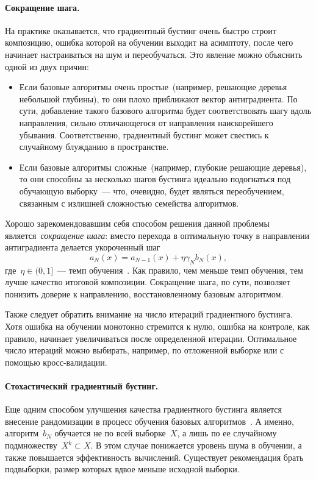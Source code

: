 \documentclass[12pt,fleqn]{article}
\begin{document}
\paragraph{Сокращение шага.}
На практике оказывается, что градиентный бустинг очень быстро
строит композицию, ошибка которой на обучении выходит на асимптоту,
после чего начинает настраиваться на шум и переобучаться.
Это явление можно объяснить одной из двух причин:
\begin{itemize}
    \item Если базовые алгоритмы очень простые~(например, решающие деревья небольшой глубины),
        то они плохо приближают вектор антиградиента.
        По сути, добавление такого базового алгоритма будет соответствовать шагу вдоль направления,
        сильно отличающегося от направления наискорейшего убывания.
        Соответственно, градиентный бустинг может свестись к случайному блужданию в пространстве.
    \item Если базовые алгоритмы сложные~(например, глубокие решающие деревья),
        то они способны за несколько шагов бустинга идеально подогнаться под обучающую выборку~---
        что, очевидно, будет являться переобучением, связанным с излишней сложностью семейства алгоритмов.
\end{itemize}
Хорошо зарекомендовавшим себя способом решения данной проблемы
является~\emph{сокращение шага}: вместо перехода в оптимальную
точку в направлении антиградиента делается укороченный шаг
\[
    a_N(x)
    =
    a_{N - 1}(x)
    +
    \eta
    \gamma_N
    b_N(x),
\]
где~$\eta \in (0, 1]$~--- темп обучения~\cite{friedman01gbm}.
Как правило, чем меньше темп обучения,
тем лучше качество итоговой композиции.
Сокращение шага, по сути, позволяет понизить доверие к направлению, восстановленному базовым алгоритмом.

Также следует обратить внимание на число итераций градиентного бустинга.
Хотя ошибка на обучении монотонно стремится к нулю, ошибка на контроле,
как правило, начинает увеличиваться после определенной итерации.
Оптимальное число итераций можно выбирать, например, по отложенной выборке
или с помощью кросс-валидации.

\paragraph{Стохастический градиентный бустинг.}
Еще одним способом улучшения качества градиентного бустинга
является внесение рандомизации в процесс обучения базовых
алгоритмов~\cite{friedman99stochastic}.
А именно, алгоритм~$b_N$ обучается не по всей выборке~$X$,
а лишь по ее случайному подмножеству~$X^{k} \subset X$.
В этом случае понижается уровень шума в обучении,
а также повышается эффективность вычислений.
Существует рекомендация брать подвыборки, размер которых вдвое меньше
исходной выборки.
\end{document}
